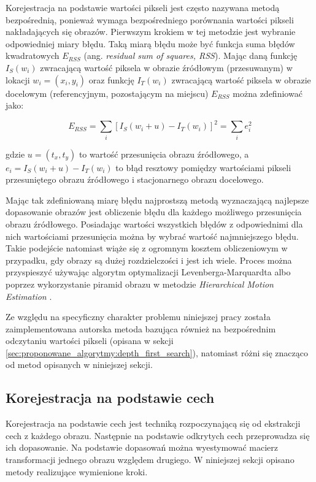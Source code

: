 Korejestracja na podstawie wartości pikseli jest często nazywana metodą bezpośrednią, ponieważ wymaga bezpośredniego porównania wartości pikseli nakładających się obrazów. Pierwszym krokiem w tej metodzie jest wybranie odpowiedniej miary błędu. Taką miarą błędu może być funkcja suma błędów kwadratowych $E_{RSS}$ (ang. \textit{residual sum of squares, RSS}). Mając daną funkcję $I_{S}(w_{i})$ zwracającą wartość piksela w obrazie źródłowym (przesuwanym) w lokacji $w_{i}=(x_{i}, y_{i})$ oraz funkcję $I_{T}(w_{i})$ zwracającą wartość piksela w obrazie docelowym (referencyjnym, pozostającym na miejscu) $E_{RSS}$ można zdefiniować jako:

\begin{equation}
E_{RSS}=\sum_{i}[I_{S}(w_{i}+u)-I_{T}(w_{i})]^2=\sum_{i}e_{i}^2
\end{equation}

gdzie $u=(t_{x}, t_{y})$ to wartość przesunięcia obrazu źródłowego, a $e_{i}=I_{S}(w_{i}+u)-I_{T}(w_{i})$ to błąd resztowy pomiędzy wartościami pikseli przesuniętego obrazu źródłowego i stacjonarnego obrazu docelowego.

Mając tak zdefiniowaną miarę błędu najprostszą metodą wyznaczającą najlepsze dopasowanie obrazów jest obliczenie błędu dla każdego możliwego przesunięcia obrazu źródłowego. Posiadając wartości wszystkich błędów z odpowiednimi dla nich wartościami przesunięcia można by wybrać wartość najmniejszego błędu. Takie podejście natomiast wiąże się z ogromnym kosztem obliczeniowym w przypadku, gdy obrazy są dużej rozdzielczości i jest ich wiele. Proces można przyspieszyć używając algorytm optymalizacji Levenberga-Marquardta \cite{unser:07} albo poprzez wykorzystanie piramid obrazu w metodzie \textit{Hierarchical Motion Estimation} \cite{export:70092}.

Ze względu na specyficzny charakter problemu niniejszej pracy została zaimplementowana autorska metoda bazująca również na bezpośrednim odczytaniu wartości pikseli (opisana w sekcji \ref{sec:proponowane_algorytmy:depth_first_search}), natomiast różni się znacząco od metod opisanych w niniejszej sekcji.

\subsection{Korejestracja na podstawie cech}
\label{sec:algorytmy_korejestracji:korejestracja_na_podstawie_cech}

Korejestracja na podstawie cech jest techniką rozpoczynającą się od ekstrakcji cech z każdego obrazu. Następnie na podstawie odkrytych cech przeprowadza się ich dopasowanie. Na podstawie dopasowań można wyestymować macierz transformacji jednego obrazu względem drugiego. W niniejszej sekcji opisano metody realizujące wymienione kroki.

